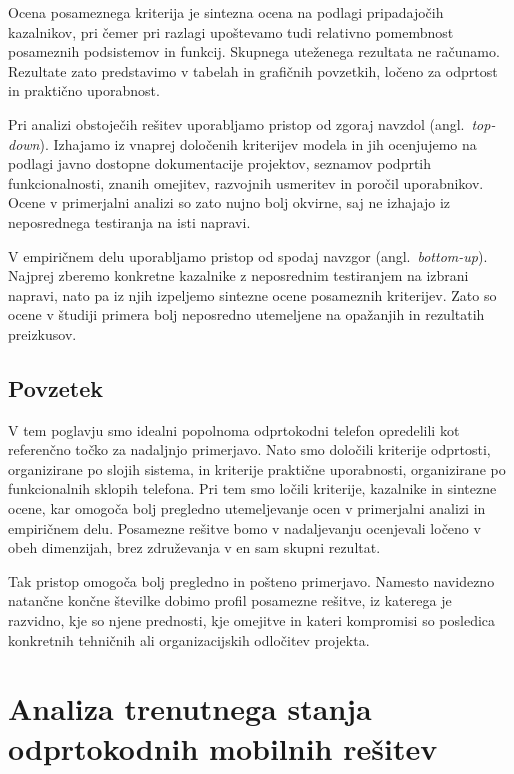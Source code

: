 \documentclass[a4paper,12pt,openright]{book}
\begin{document}
Ocena posameznega kriterija je sintezna ocena na podlagi pripadajočih kazalnikov, pri čemer pri razlagi upoštevamo tudi relativno pomembnost posameznih podsistemov in funkcij.
Skupnega uteženega rezultata ne računamo.
Rezultate zato predstavimo v tabelah in grafičnih povzetkih, ločeno za odprtost in praktično uporabnost.

Pri analizi obstoječih rešitev uporabljamo pristop od zgoraj navzdol (angl.~\textit{top-down}).
Izhajamo iz vnaprej določenih kriterijev modela in jih ocenjujemo na podlagi javno dostopne dokumentacije projektov, seznamov podprtih funkcionalnosti, znanih omejitev, razvojnih usmeritev in poročil uporabnikov.
Ocene v primerjalni analizi so zato nujno bolj okvirne, saj ne izhajajo iz neposrednega testiranja na isti napravi.

V empiričnem delu uporabljamo pristop od spodaj navzgor (angl.~\textit{bottom-up}).
Najprej zberemo konkretne kazalnike z neposrednim testiranjem na izbrani napravi, nato pa iz njih izpeljemo sintezne ocene posameznih kriterijev.
Zato so ocene v študiji primera bolj neposredno utemeljene na opažanjih in rezultatih preizkusov.

\section{Povzetek}
\label{sec:model_povzetek}

V tem poglavju smo idealni popolnoma odprtokodni telefon opredelili kot referenčno točko za nadaljnjo primerjavo.
Nato smo določili kriterije odprtosti, organizirane po slojih sistema, in kriterije praktične uporabnosti, organizirane po funkcionalnih sklopih telefona.
Pri tem smo ločili kriterije, kazalnike in sintezne ocene, kar omogoča bolj pregledno utemeljevanje ocen v primerjalni analizi in empiričnem delu.
Posamezne rešitve bomo v nadaljevanju ocenjevali ločeno v obeh dimenzijah, brez združevanja v en sam skupni rezultat.

Tak pristop omogoča bolj pregledno in pošteno primerjavo.
Namesto navidezno natančne končne številke dobimo profil posamezne rešitve, iz katerega je razvidno, kje so njene prednosti, kje omejitve in kateri kompromisi so posledica konkretnih tehničnih ali organizacijskih odločitev projekta.

\chapter{Analiza trenutnega stanja odprtokodnih mobilnih rešitev}
\label{chap:analiza_trenutnega_stanja}
\end{document}
